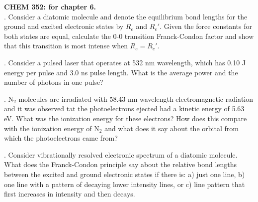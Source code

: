 \noindent
\textbf{CHEM 352:
 for chapter 6.}\\

. Consider a diatomic molecule and denote the equilibrium bond lengths for the ground and excited electronic states by $R_e$ and $R_e'$. Given the force constants for both states are equal, calculate the 0-0 transition Franck-Condon factor and show that this transition is most intense when $R_e = R_e'$.\\


. Consider a pulsed laser that operates at 532 nm wavelength, which has 0.10 J energy per pulse and 3.0 ns pulse length.
What is the average power and the number of photons in one pulse?\\


. N$_2$ molecules are irradiated with 58.43 nm wavelength electromagnetic radiation and it was observed tat the photoelectrons 
ejected had a kinetic energy of 5.63 eV. What was the ionization energy for these electrons? How does this compare with the
ionization energy of N$_2$ and what does it say about the orbital from which the photoelectrons came from?\\


. Consider vibrationally resolved electronic spectrum of a diatomic molecule. What does the Franck-Condon principle say about
the relative bond lengths between the excited and ground electronic states if there is:
a) just one line, b) one line with a pattern of decaying lower intensity lines, or c) line pattern that first increases in 
intensity and then decays.\\


